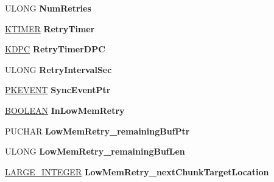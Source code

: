 \begin{DoxyCompactItemize}
\item 
\mbox{\label{struct___t_r_a_n_s_f_e_r___p_a_c_k_e_t_a28818296f16c3b2a14fe8e23d8058eb7}} 
U\+L\+O\+NG {\bfseries Num\+Retries}
\item 
\mbox{\label{struct___t_r_a_n_s_f_e_r___p_a_c_k_e_t_ac9c9d6f731587682213459e9af4f0a5b}} 
\hyperlink{struct___k_t_i_m_e_r}{K\+T\+I\+M\+ER} {\bfseries Retry\+Timer}
\item 
\mbox{\label{struct___t_r_a_n_s_f_e_r___p_a_c_k_e_t_a7555f4f0ae531b2f22a2e0580279f816}} 
\hyperlink{struct___k_d_p_c}{K\+D\+PC} {\bfseries Retry\+Timer\+D\+PC}
\item 
\mbox{\label{struct___t_r_a_n_s_f_e_r___p_a_c_k_e_t_af08e94bdd7f6450de5e087265254af71}} 
U\+L\+O\+NG {\bfseries Retry\+Interval\+Sec}
\item 
\mbox{\label{struct___t_r_a_n_s_f_e_r___p_a_c_k_e_t_ae5824e1a7225da43db45a84462fdaa63}} 
\hyperlink{struct___k_e_v_e_n_t}{P\+K\+E\+V\+E\+NT} {\bfseries Sync\+Event\+Ptr}
\item 
\mbox{\label{struct___t_r_a_n_s_f_e_r___p_a_c_k_e_t_ae7577638f23921d3989c751323dbc08f}} 
\hyperlink{_processor_bind_8h_a112e3146cb38b6ee95e64d85842e380a}{B\+O\+O\+L\+E\+AN} {\bfseries In\+Low\+Mem\+Retry}
\item 
\mbox{\label{struct___t_r_a_n_s_f_e_r___p_a_c_k_e_t_a1ed32188bfb64e6ceb3ba695602dfe10}} 
P\+U\+C\+H\+AR {\bfseries Low\+Mem\+Retry\+\_\+remaining\+Buf\+Ptr}
\item 
\mbox{\label{struct___t_r_a_n_s_f_e_r___p_a_c_k_e_t_ac5fe87061f1d2cc9baae4d07a0fa8aba}} 
U\+L\+O\+NG {\bfseries Low\+Mem\+Retry\+\_\+remaining\+Buf\+Len}
\item 
\mbox{\label{struct___t_r_a_n_s_f_e_r___p_a_c_k_e_t_a2f99179257e6213098f1a487dd79767d}} 
\hyperlink{union___l_a_r_g_e___i_n_t_e_g_e_r}{L\+A\+R\+G\+E\+\_\+\+I\+N\+T\+E\+G\+ER} {\bfseries Low\+Mem\+Retry\+\_\+next\+Chunk\+Target\+Location}

\end{DoxyCompactItemize}
